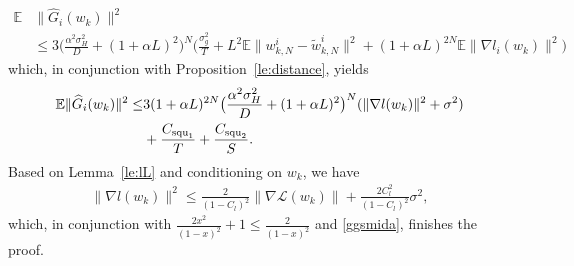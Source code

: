 \documentclass{osudissert96}
\begin{document}
	\begin{align}
	\mathbb{E}&\|\widehat G_i(w_k)\|^2  \nonumber
	\\  &\leq  3\Big(\frac{\alpha^2\sigma_H^2}{D} + (1+\alpha L)^2\Big)^N\Big( \frac{\sigma_g^2}{T} + L^2 \mathbb{E}\|w_{k,N}^i - \widetilde w_{k,N}^i\|^2 + (1+\alpha L)^{2N} \mathbb{E}\|\nabla l_i(w_k)\|^2\Big) \nonumber
	\end{align}
	which, in conjunction with Proposition~\ref{le:distance},  
	yields 
	\begin{align}\label{ggsmida}
	\mathbb{E}\|\widehat G_i(w_k)\|^2   \leq& 3(1+\alpha L)^{2N} \big(\frac{\alpha^2\sigma_H^2}{D} + (1+\alpha L)^2\big)^N (\|\nabla l(w_k)\|^2 + \sigma^2)\nonumber
	\\&+\frac{C_{\text{\normalfont squ}_1}}{T} + \frac{C_{\text{\normalfont squ}_2}}{S}.
	\end{align} 	
Based on Lemma~\ref{le:lL} and  conditioning on $w_k$, we have  
	\begin{align*}
	\|\nabla l(w_k)\|^2 \leq \frac{2}{(1-C_l)^2} \|\nabla \mathcal{L}(w_k)\| + \frac{2C_l^2}{(1-C_l)^2} \sigma^2,
	\end{align*}
	which, in conjunction with  $\frac{2x^2}{(1-x)^2}+1 \leq \frac{2}{(1-x)^2}$ and \cref{ggsmida}, finishes the proof. 

\end{document}
